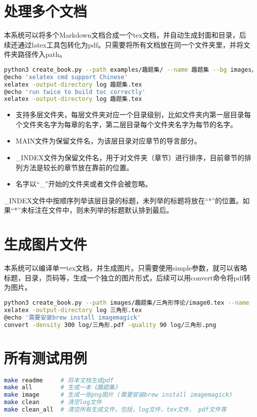 \documentclass[12pt, letterpaper]{ctexrep}
\begin{document}
\section{处理多个文档}
本系统可以将多个Markdown文档合成一个tex文档，并自动生成封面和目录，后续还通过latex工具包转化为pdf。只需要将所有文档放在同一个文件夹里，并将文件夹路径传入path。


\begin{lstlisting}[language=Bash]
python3 create_book.py --path examples/趣题集/ --name 趣题集 --bg images/趣题集/background.jpeg --author 南方小智
@echo 'xelatex cmd support Chinese'
xelatex -output-directory log 趣题集.tex
@echo 'run twice to build toc correctly'
xelatex -output-directory log 趣题集.tex
\end{lstlisting}


\begin{itemize}
\item{ 支持多层文件夹，每层文件夹对应一个目录级别，比如文件夹内第一层目录每个文件夹名字为每章的名字，第二层目录每个文件夹名字为每节的名字。 }
\item{ MAIN文件为保留文件名，为该层目录对应章节的导言部分。 }
\item{ \_INDEX文件为保留文件名，用于对文件夹（章节）进行排序，目前章节的排列方法是较长的章节放在靠前的位置。 }
\item{ 名字以“\_”开始的文件夹或者文件会被忽略。 }
\end{itemize}


\_INDEX文件中按顺序列举该层目录的标题，未列举的标题将放在“*”的位置。如果“*”未标注在文件中，则未列举的标题默认排到最后。




\section{生成图片文件}
本系统可以编译单一tex文档，并生成图片。只需要使用simple参数，就可以省略标题，目录，页码等，生成一个独立的图片形式，后续可以用convert命令将pdf转为图片。

\begin{lstlisting}[language=Bash]
python3 create_book.py --path images/趣题集/三角形悖论/image0.tex --name 三角形 --simple
xelatex -output-directory log 三角形.tex
@echo '需要安装brew install imagemagick'
convert -density 300 log/三角形.pdf -quality 90 log/三角形.png
\end{lstlisting}

\section{所有测试用例}
\begin{lstlisting}[language=Bash]
make readme     # 将本文档生成pdf
make all        # 生成一本《趣题集》
make image      # 生成一张png图片 (需要安装brew install imagemagick)
make clean      # 清空log文件
make clean_all  # 清空所有生成文件，包括，log文件，tex文件， pdf文件等
\end{lstlisting}
\end{document}
